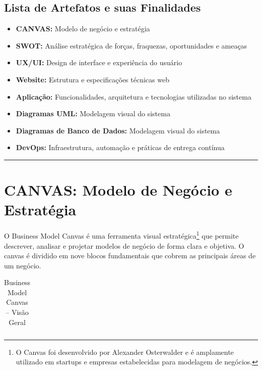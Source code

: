 \documentclass[11pt,a4paper]{article}
\begin{document}
\pagestyle{fancy}

\tableofcontents
\newpage

\subsection*{Lista de Artefatos e suas Finalidades}

\begin{itemize}
    \item \textbf{CANVAS:} Modelo de negócio e estratégia
    \item \textbf{SWOT:} Análise estratégica de forças, fraquezas, oportunidades e ameaças
    \item \textbf{UX/UI:} Design de interface e experiência do usuário
    \item \textbf{Website:} Estrutura e especificações técnicas web
     \item \textbf{Aplicação:} Funcionalidades, arquitetura e tecnologias utilizadas no sistema
    \item \textbf{Diagramas UML:} Modelagem visual do sistema
    \item \textbf{Diagramas de Banco de Dados:} Modelagem visual do sistema
    \item \textbf{DevOps:} Infraestrutura, automação e práticas de entrega contínua
\end{itemize}

\vspace{0.5cm}
\noindent\rule{\textwidth}{0.5pt}

\newpage

\section{CANVAS: Modelo de Negócio e Estratégia}

O Business Model Canvas \cite{santos2024} é uma ferramenta visual estratégica\footnote{O Canvas foi desenvolvido por Alexander Osterwalder e é amplamente utilizado em startups e empresas estabelecidas para modelagem de negócios.} que permite descrever, analisar e projetar modelos de negócio de forma clara e objetiva. O canvas é dividido em nove blocos fundamentais que cobrem as principais áreas de um negócio.

\begin{table}[H]
\centering
\caption{Business Model Canvas -- Visão Geral}
\label{tab:canvas}
\small
\begin{tabular}{|p{2.5cm}|p{2.5cm}|p{2.8cm}|p{2.5cm}|p{2.8cm}|}
\end{tabular}
\end{table}
\end{document}
